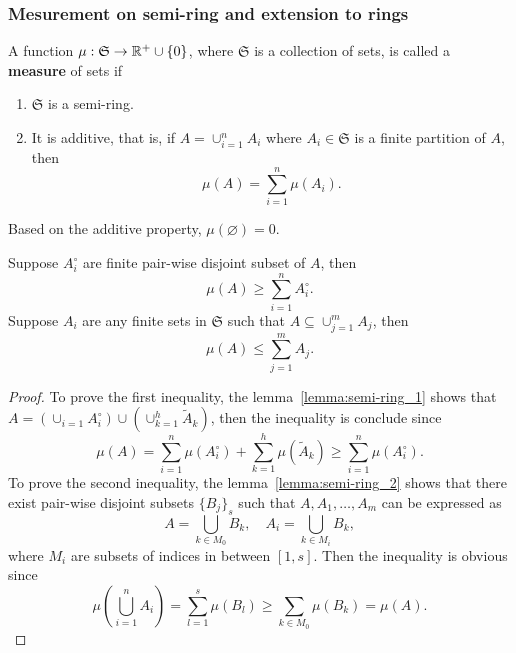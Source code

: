 \subsubsection{Mesurement on semi-ring and extension to rings}

\begin{definition}
A function $\mu:\mathfrak{S}\to\mathbb{R}^+\cup\{0\}$, where $\mathfrak{S}$ is a collection of sets, is called a \textbf{measure} of sets if
\begin{enumerate}
\item $\mathfrak{S}$ is a semi-ring.
\item It is additive, that is, if $A=\cup_{i=1}^nA_i$ where $A_i\in \mathfrak{S}$ is a finite partition of $A$, then
\begin{equation}
\mu(A)=\sum_{i=1}^n\mu(A_i).
\end{equation}
\end{enumerate} 
\end{definition}

Based on the additive property, $\mu(\varnothing)=0$. 
\begin{theorem}
Suppose $A^\circ_i$ are finite pair-wise disjoint subset of $A$, then
\begin{equation}
\mu(A)\ge \sum_{i=1}^nA^\circ_i.
\end{equation}
Suppose $A_i$ are any finite sets in $\mathfrak{S}$ such that $A\subseteq \cup_{j=1}^mA_j$, then
\begin{equation}
\mu(A)\le\sum_{j=1}^mA_j.
\end{equation}
\end{theorem}

\begin{proof}
To prove the first inequality, the lemma~\ref{lemma:semi-ring_1} shows that $A=(\cup_{i=1}A^\circ_i)\cup (\cup_{k=1}^{h}\tilde A_k)$, then the inequality is conclude since
\begin{equation*}
\mu(A)=\sum_{i=1}^n\mu(A^\circ_i)+\sum_{k=1}^h\mu(\tilde A_k)\ge\sum_{i=1}^n\mu(A^\circ_i).
\end{equation*}
To prove the second inequality, the lemma~\ref{lemma:semi-ring_2} shows that there exist pair-wise disjoint subsets $\{B_j\}_s$ such that $A,A_1,\dots,A_m$ can be expressed as
\begin{equation}
A=\bigcup_{k\in M_0}B_k,\quad A_i=\bigcup_{k\in M_i}B_k,
\end{equation}
where $M_i$ are subsets of indices in between $[1,s]$. Then the inequality is obvious since
\begin{equation}
\mu\left(\bigcup_{i=1}^nA_i\right)=\sum_{l=1}^s\mu(B_l)\ge\sum_{k\in M_0}\mu(B_k)=\mu(A).
\end{equation}
\end{proof}

